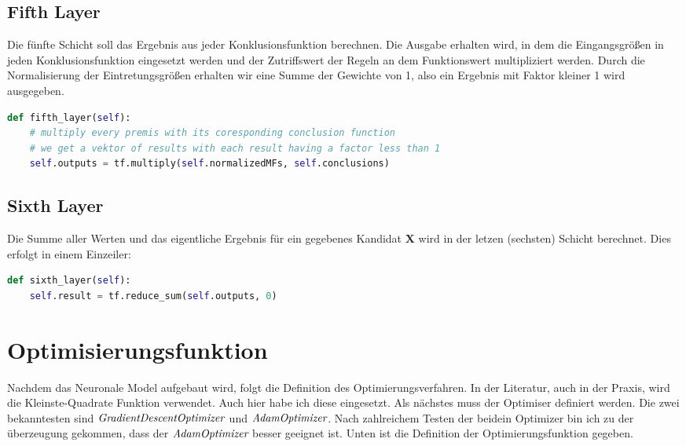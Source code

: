 \subsection{Fifth Layer}\label{fifth-layer}

Die fünfte Schicht soll das Ergebnis aus jeder Konklusionsfunktion berechnen. Die Ausgabe erhalten wird, in dem die Eingangsgrößen in jeden Konklusionsfunktion eingesetzt werden und der Zutriffswert der Regeln an dem Funktionswert multipliziert werden. Durch die Normalisierung der Eintretungsgrößen erhalten wir eine Summe der Gewichte von 1, also ein Ergebnis mit Faktor kleiner 1 wird ausgegeben.

\begin{lstlisting}[language=Python]
def fifth_layer(self):
	# multiply every premis with its coresponding conclusion function
	# we get a vektor of results with each result having a factor less than 1
	self.outputs = tf.multiply(self.normalizedMFs, self.conclusions)
\end{lstlisting}

\subsection{Sixth Layer}\label{sixth-layer}

Die Summe aller Werten und das eigentliche Ergebnis für ein gegebenes Kandidat $\textbf{X}$ wird in der letzen (sechsten) Schicht berechnet. Dies erfolgt in einem Einzeiler:

\begin{lstlisting}[language=Python]
def sixth_layer(self):
	self.result = tf.reduce_sum(self.outputs, 0)
\end{lstlisting}

\section{Optimisierungsfunktion}\label{optimisierungsfunktion}

Nachdem das Neuronale Model aufgebaut wird, folgt die Definition des Optimierungsverfahren. In der Literatur, auch in der Praxis, wird die Kleinste-Quadrate Funktion verwendet. Auch hier habe ich diese eingesetzt. Als nächstes muss der Optimiser definiert werden. Die zwei bekanntesten sind $\emph{GradientDescentOptimizer}$ und $\emph{AdamOptimizer}$. Nach zahlreichem Testen der beidein Optimizer bin ich zu der überzeugung gekommen, dass der $\emph{AdamOptimizer}$ besser geeignet ist. Unten ist die Definition der Optimierungsfunktion gegeben.

